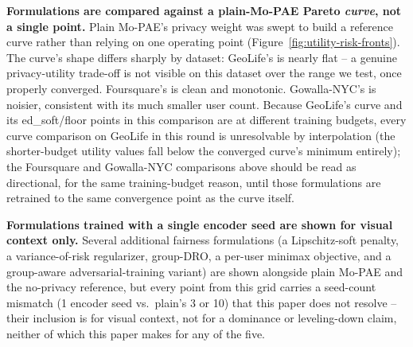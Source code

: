 \textbf{Formulations are compared against a plain-Mo-PAE Pareto
\emph{curve}, not a single point.} Plain Mo-PAE's privacy weight was
swept to build a reference curve rather than relying on one operating
point (Figure~\ref{fig:utility-risk-fronts}). The curve's shape differs
sharply by dataset: GeoLife's is nearly flat -- a genuine
privacy-utility trade-off is not visible on this dataset over the range
we test, once properly converged. Foursquare's is clean and monotonic.
Gowalla-NYC's is noisier, consistent with its much smaller user count.
Because GeoLife's curve and its ed\_soft/floor points in this
comparison are at different training budgets, every curve comparison on
GeoLife in this round is unresolvable by interpolation (the
shorter-budget utility values fall below the converged curve's minimum
entirely); the Foursquare and Gowalla-NYC comparisons above should be
read as directional, for the same training-budget reason, until those
formulations are retrained to the same convergence point as the curve
itself.

\textbf{Formulations trained with a single encoder seed are shown for
visual context only.} Several additional fairness formulations
(a Lipschitz-soft penalty, a variance-of-risk regularizer, group-DRO, a
per-user minimax objective, and a group-aware adversarial-training
variant) are shown alongside plain Mo-PAE and the no-privacy reference,
but every point from this grid carries a seed-count mismatch (1 encoder
seed vs.\ plain's 3 or 10) that this paper does not resolve -- their
inclusion is for visual context, not for a dominance or leveling-down
claim, neither of which this paper makes for any of the five.
